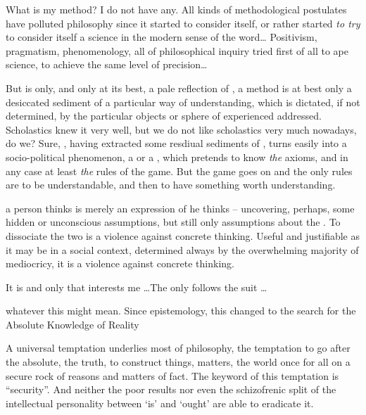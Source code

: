 {What is my method?  I do not have any. 
 All kinds of methodological postulates have polluted philosophy 
since it started to consider itself, or rather started 
{\em to try} to 
consider itself a science in the modern sense of the word\ldots
Positivism, pragmatism, phenomenology, all  of 
philosophical inquiry tried first of all to ape 
science, to achieve the same level of precision\ldots

But  is only, and only at its best, a pale reflection of
, a method is at best only a desiccated sediment of a
particular way of understanding, which is dictated, if not determined,
by the particular objects or sphere of experienced addressed. 
Scholastics knew it very well, but we do not like scholastics very
much nowadays, do we?  Sure, , having extracted some resdiual
sediments of , turns easily into a socio-political
phenomenon, a  or a , which pretends to know
{\em the} axioms, and in any case at least {\em the} rules of the
game.  But the game goes on and the only rules are to be
understandable, and then to have something worth understanding. 

 a person thinks is merely an expression of  he
thinks -- uncovering, perhaps, some hidden or unconscious assumptions,
but still only assumptions about the . To dissociate the two is a
violence against concrete thinking. Useful and justifiable as it may 
be in a social context, determined always by the overwhelming 
majority of mediocricy, it is a violence against concrete thinking.

It is
 and only  that interests me \ldots The  
only follows the suit \ldots 





whatever this might 
mean. Since epistemology, this changed to the search for the Absolute 
Knowledge of Reality

A universal temptation underlies most of philosophy, the temptation 
to go after the absolute, the  truth, to 
construct things, matters, the world once for all on a secure rock of 
 reasons and matters of fact. The keyword of this 
temptation is ``security''. And neither the poor results nor even the 
schizofrenic split of the intellectual personality between `is' and `ought' 
are able to eradicate it. 

}

